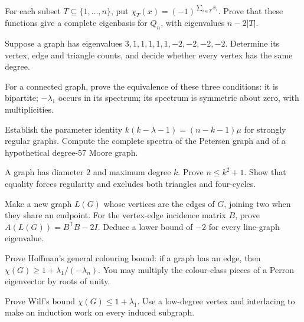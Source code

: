 \begin{exercise}[$\star$]\label{linear:ex:hypercube}
For each subset $T\subseteq\{1,\ldots,n\}$, put $\chi_T(x)=(-1)^{\sum_{i\in T}x_i}$. Prove that these functions give a complete eigenbasis for $Q_n$, with eigenvalues $n-2|T|$.
\end{exercise}
\begin{exercise}[$\star$]\label{linear:ex:spectrumcount}
Suppose a graph has eigenvalues $3,1,1,1,1,1,-2,-2,-2,-2$. Determine its vertex, edge and triangle counts, and decide whether every vertex has the same degree.
\end{exercise}
\begin{exercise}[$\star\star$]\label{linear:ex:bipartite}
For a connected graph, prove the equivalence of these three conditions: it is bipartite; $-\lambda_1$ occurs in its spectrum; its spectrum is symmetric about zero, with multiplicities.
\end{exercise}
\begin{exercise}[$\star$]\label{linear:ex:srgcount}
Establish the parameter identity $k(k-\lambda-1)=(n-k-1)\mu$ for strongly regular graphs. Compute the complete spectra of the Petersen graph and of a hypothetical degree-$57$ Moore graph.
\end{exercise}
\begin{exercise}[$\star$]\label{linear:ex:moorebound}
A graph has diameter $2$ and maximum degree $k$. Prove $n\le k^2+1$. Show that equality forces regularity and excludes both triangles and four-cycles.
\end{exercise}
\begin{exercise}[$\star\star$]\label{linear:ex:linegraph}
Make a new graph $L(G)$ whose vertices are the edges of $G$, joining two when they share an endpoint. For the vertex-edge incidence matrix $B$, prove $A(L(G))=B^{\mathsf T}B-2I$. Deduce a lower bound of $-2$ for every line-graph eigenvalue.
\end{exercise}
\begin{exercise}[$\star\star$]\label{linear:ex:chromatic}
Prove Hoffman's general colouring bound: if a graph has an edge, then $\chi(G)\ge1+\lambda_1/(-\lambda_n)$. You may multiply the colour-class pieces of a Perron eigenvector by roots of unity.
\end{exercise}
\begin{exercise}[$\star\star$]\label{linear:ex:wilf}
Prove Wilf's bound $\chi(G)\le1+\lambda_1$. Use a low-degree vertex and interlacing to make an induction work on every induced subgraph.
\end{exercise}
